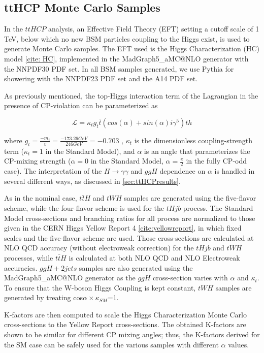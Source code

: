 \subsection{ttHCP Monte Carlo Samples} \label{sec:ttHCPMC} 

In the $ttH CP$ analysis, an Effective Field Theory (EFT) setting a cutoff scale of 1 TeV, below which no new BSM particles coupling to the Higgs exist, is used to generate Monte Carlo samples. The EFT used is the Higgs Characterization (HC) model \ref{cite: HC}, implemented in the MadGraph5_aMC@NLO generator with the NNPDF30 PDF set. In all BSM samples generated, we use Pythia for showering with the NNPDF23 PDF set and the A14 PDF set.

As previously mentioned, the top-Higgs interaction term of the Lagrangian in the presence of CP-violation can be parameterized as

\begin{equation}
\mathcal{L} = \kappa_{t} g_{t} \bar{t} (cos(\alpha)+ sin(\alpha) i \gamma^{5} )th
\end{equation}

where $g_{t} = \frac{-m_{t}}{v} = \frac{-173.26 GeV}{246 GeV} = -0.703$ , $\kappa_{t}$ is the dimensionless coupling-strength term ($\kappa_{t}= 1$ in the Standard Model), and $\alpha$ is an angle that parameterizes the CP-mixing strength ($\alpha = 0$ in the Standard Model, $\alpha = \frac{\pi}{2}$ in the fully CP-odd case). The interpretation of the $H \rightarrow \gamma \gamma$ and $ggH$ dependence on $\alpha$ is handled in several different ways, as discussed in \ref{sec:ttHCPresults}.

As in the nominal case, $t\bar{t}H$ and $tWH$ samples are generated using the five-flavor scheme, while the four-flavor scheme is used for the $tHjb$ process. The Standard Model cross-sections and branching ratios for all process are normalized to those given in the CERN Higgs Yellow Report 4 \ref{cite:yellowreport}, in which fixed scales and the five-flavor scheme are used. Those cross-sections are calculated at NLO QCD accuracy (without electroweak correction) for the $tHjb$ and $tWH$ processes, while $t\bar{t}H$ is calculated at both NLO QCD and NLO Electroweak accuracies. $ggH+ 2 jets$ samples are also generated using the MadGraph5_aMC@NLO generator as the $ggH$ cross-section varies with $\alpha$ and $\kappa_{t}$. To ensure that the W-boson Higgs Coupling is kept constant, $tWH$ samples are generated by treating cos$\alpha \times \kappa_{SM}$=1.


K-factors are then computed to scale the Higgs Characterization Monte Carlo cross-sections to the Yellow Report cross-sections. The obtained K-factors are shown to be similar for different CP mixing angles; thus, the K-factors derived for the SM case can be safely used for the various samples with different $\alpha$ values. 

